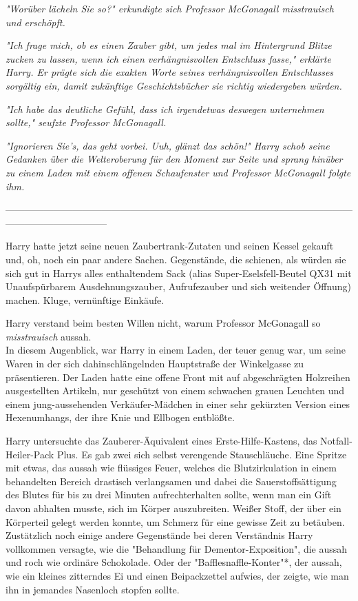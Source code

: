 {\emph{"Worüber lächeln Sie so?" erkundigte sich Professor McGonagall misstrauisch und erschöpft.}

\emph{"Ich frage mich, ob es einen Zauber gibt, um jedes mal im Hintergrund Blitze zucken zu lassen, wenn ich einen verhängnisvollen Entschluss fasse," erklärte Harry. Er prägte sich die exakten Worte seines verhängnisvollen Entschlusses sorgältig ein, damit zukünftige Geschichtsbücher sie richtig wiedergeben würden.}

\emph{"Ich habe das deutliche Gefühl, dass ich irgendetwas deswegen} \emph{unternehmen sollte," seufzte Professor McGonagall.}

\emph{"Ignorieren Sie's, das geht vorbei. Uuh, glänzt das schön!" Harry schob seine Gedanken über die Welteroberung für den Moment zur Seite und sprang hinüber zu einem Laden mit einem offenen Schaufenster und Professor McGonagall folgte ihm.}

--------------------------------------------------------------------------------------------------------------------------------------------

Harry hatte jetzt seine neuen Zaubertrank-Zutaten und seinen Kessel gekauft und, oh, noch ein paar andere Sachen. Gegenstände, die schienen, als würden sie sich gut in Harrys alles enthaltendem Sack (alias Super-Eselsfell-Beutel QX31 mit Unaufspürbarem Ausdehnungszauber, Aufrufezauber und sich weitender Öffnung) machen. Kluge, vernünftige Einkäufe.

Harry verstand beim besten Willen nicht, warum Professor McGonagall so \emph{misstrauisch} aussah.\\ In diesem Augenblick, war Harry in einem Laden, der teuer genug war, um seine Waren in der sich dahinschlängelnden Hauptstraße der Winkelgasse zu präsentieren. Der Laden hatte eine offene Front mit auf abgeschrägten Holzreihen ausgestellten Artikeln, nur geschützt von einem schwachen grauen Leuchten und einem jung-aussehenden Verkäufer-Mädchen in einer sehr gekürzten Version eines Hexenumhangs, der ihre Knie und Ellbogen entblößte.

Harry untersuchte das Zauberer-Äquivalent eines Erste-Hilfe-Kastens, das Notfall-Heiler-Pack Plus. Es gab zwei sich selbst verengende Stauschläuche. Eine Spritze mit etwas, das aussah wie flüssiges Feuer, welches die Blutzirkulation in einem behandelten Bereich drastisch verlangsamen und dabei die Sauerstoffsättigung des Blutes für bis zu drei Minuten aufrechterhalten sollte, wenn man ein Gift davon abhalten musste, sich im Körper auszubreiten. Weißer Stoff, der über ein Körperteil gelegt werden konnte, um Schmerz für eine gewisse Zeit zu betäuben. Zustätzlich noch einige andere Gegenstände bei deren Verständnis Harry vollkommen versagte, wie die "Behandlung für Dementor-Exposition", die aussah und roch wie ordinäre Schokolade. Oder der "Bafflesnaffle-Konter"*, der aussah, wie ein kleines zitterndes Ei und einen Beipackzettel aufwies, der zeigte, wie man ihn in jemandes Nasenloch stopfen sollte.

}
